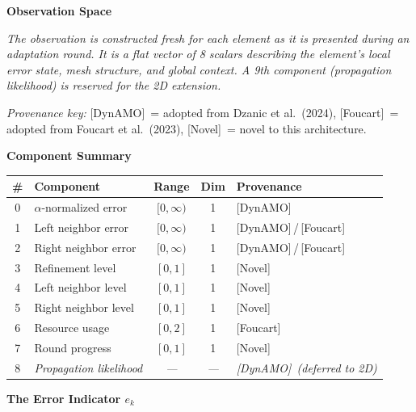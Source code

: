 \documentclass[11pt]{article}
\newcommand{\provdynamo}{\textcolor{dynamo}{\textsf{[DynAMO]}}}
\newcommand{\provfoucart}{\textcolor{foucart}{\textsf{[Foucart]}}}
\newcommand{\provnovel}{\textcolor{novel}{\textsf{[Novel]}}}
\newcommand{\provboth}{\textcolor{dynamo}{\textsf{[DynAMO]}}\,/\,\textcolor{foucart}{\textsf{[Foucart]}}}
\begin{document}
\begin{center}
{\Large\bfseries Observation Space}
\end{center}

\vspace{0.15cm}
\noindent\textit{The observation is constructed fresh for each element as it is presented during an adaptation round. It is a flat vector of 8 scalars describing the element's local error state, mesh structure, and global context. A 9th component (propagation likelihood) is reserved for the 2D extension.}

\vspace{0.15cm}
\noindent\textit{Provenance key:}
\provdynamo\ = adopted from Dzanic et al.\ (2024),\quad
\provfoucart\ = adopted from Foucart et al.\ (2023),\quad
\provnovel\ = novel to this architecture.

\vspace{0.4cm}
\noindent\textbf{Component Summary}

\vspace{0.2cm}
\begin{center}
\renewcommand{\arraystretch}{1.4}
\begin{tabular}{c l c c l}
\toprule
\# & Component & Range & Dim & Provenance \\
\midrule
0 & $\alpha$-normalized error & $[0, \infty)$ & 1 & \provdynamo \\
1 & Left neighbor error & $[0, \infty)$ & 1 & \provboth \\
2 & Right neighbor error & $[0, \infty)$ & 1 & \provboth \\
3 & Refinement level & $[0, 1]$ & 1 & \provnovel \\
4 & Left neighbor level & $[0, 1]$ & 1 & \provnovel \\
5 & Right neighbor level & $[0, 1]$ & 1 & \provnovel \\
6 & Resource usage & $[0, 2]$ & 1 & \provfoucart \\
7 & Round progress & $[0, 1]$ & 1 & \provnovel \\
\midrule
8 & \textit{Propagation likelihood} & \textit{---} & \textit{---} & \textit{\provdynamo\ (deferred to 2D)} \\
\bottomrule
\end{tabular}
\end{center}

\vspace{0.5cm}
\noindent\textbf{The Error Indicator $e_k$}
\end{document}
